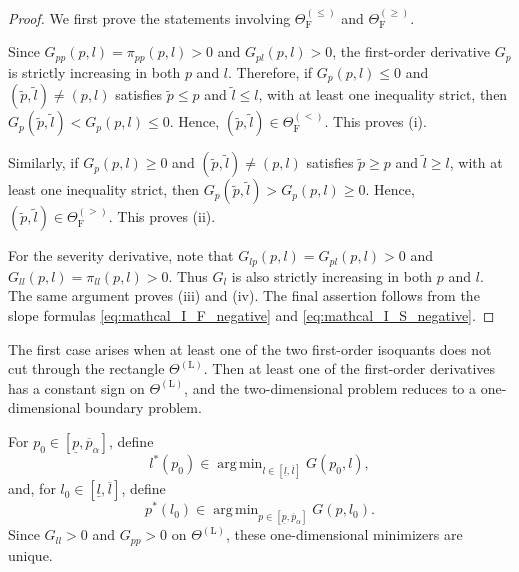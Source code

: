 \documentclass[a4paper,12pt]{article}
\DeclareMathOperator*{\argmin}{arg\,min}
\begin{document}
\begin{proof}
We first prove the statements involving  $\Theta_{\text{F}}^{\left(\leq\right)}$ and $\Theta_{\text{F}}^{\left(\geq\right)}$.

Since $G_{pp}\left(p,l\right)=\pi_{pp}\left(p,l\right)>0$ and $G_{pl}\left(p,l\right)>0$, the first-order derivative $G_p$ is strictly increasing in both $p$ and $l$. Therefore, if $G_{p}\left(p,l\right)\leq 0$ and $\left(\tilde{p},\tilde{l}\right)\neq\left(p,l\right)$ satisfies $\tilde{p}\leq p$ and $\tilde{l}\leq l$, with at least one inequality strict, then $G_{p}\left(\tilde{p},\tilde{l}\right)<G_{p}\left(p,l\right)\leq 0$. Hence, $\left(\tilde{p},\tilde{l}\right)\in\Theta_{\text{F}}^{\left(<\right)}$. This proves (i).

Similarly, if $G_{p}\left(p,l\right)\geq 0$ and $\left(\tilde{p},\tilde{l}\right)\neq\left(p,l\right)$ satisfies $\tilde{p}\geq p$ and $\tilde{l}\geq l$, with at least one inequality strict, then $G_{p}\left(\tilde{p},\tilde{l}\right)>G_{p}\left(p,l\right)\geq 0$. Hence, $\left(\tilde{p},\tilde{l}\right)\in\Theta_{\text{F}}^{\left(>\right)}$. This proves (ii).

For the severity derivative, note that $G_{lp}\left(p,l\right)=G_{pl}\left(p,l\right)>0$ and $G_{ll}\left(p,l\right)=\pi_{ll}\left(p,l\right)>0$. Thus $G_l$ is also strictly increasing in both $p$ and $l$. The same argument proves (iii) and (iv). The final assertion follows from the slope formulas \eqref{eq:mathcal_I_F_negative} and \eqref{eq:mathcal_I_S_negative}.
\end{proof}

The first case arises when at least one of the two first-order isoquants does not cut through the rectangle $\Theta^{\left(\text{L}\right)}$. Then at least one of the first-order derivatives has a constant sign on $\Theta^{\left(\text{L}\right)}$, and the two-dimensional problem reduces to a one-dimensional boundary problem.

For $p_0\in\left[\underline{p},\overline{p}_{\alpha}\right]$, define
\begin{equation}
l^*\left(p_0\right)\in\argmin_{l\in\left[\underline{l},\overline{l}\right]}G\left(p_0,l\right),
\label{eq:boundary_l^*}
\end{equation}
and, for $l_0\in\left[\underline{l},\overline{l}\right]$, define
\begin{equation}
p^*\left(l_0\right)\in\argmin_{p\in\left[\underline{p},\overline{p}_{\alpha}\right]}G\left(p,l_0\right).
\label{eq:boundary_p^*}
\end{equation}
Since $G_{ll}>0$ and $G_{pp}>0$ on $\Theta^{\left(\text{L}\right)}$, these one-dimensional minimizers are unique.
\end{document}
